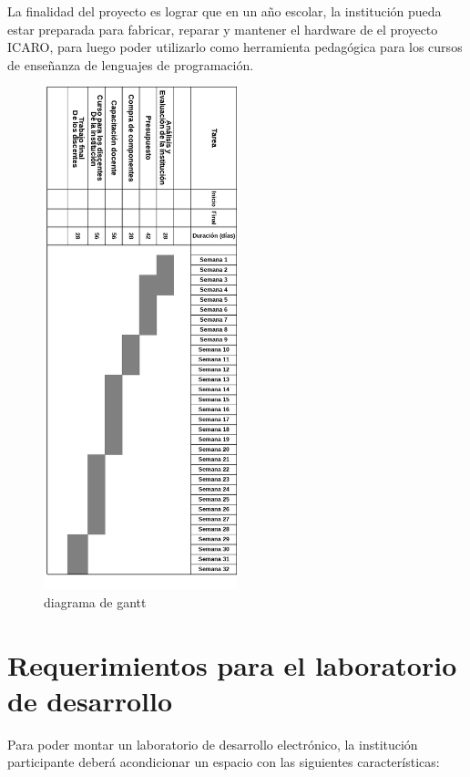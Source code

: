La finalidad del proyecto es lograr que en un año escolar, la institución pueda estar preparada para fabricar, reparar y mantener el hardware de el proyecto ICARO, para luego poder utilizarlo como herramienta pedagógica para los cursos de enseñanza de lenguajes de programación.

\begin{figure}[H]
  \begin{center}
    \includegraphics[width=0.5\textwidth]{./figuras/gantt2.png}
    \caption{diagrama de gantt}
    \label{fig:gantt}
  \end{center}
\end{figure}


\section{Requerimientos para el laboratorio de desarrollo}
Para poder montar un laboratorio de desarrollo electrónico, la institución participante deberá acondicionar un espacio con las siguientes características:

